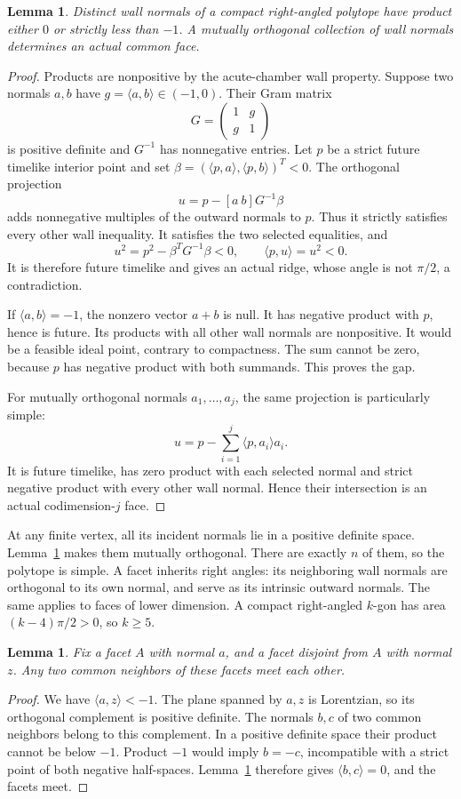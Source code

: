 \documentclass[11pt]{article}
\newtheorem{lemma}[theorem]{Lemma}
\theoremstyle{remark}
\newcommand{\ip}[2]{\langle #1,#2\rangle}
\begin{document}
\begin{lemma}\label{lem:gap}
Distinct wall normals of a compact right-angled polytope have product
either $0$ or strictly less than $-1$. A mutually orthogonal collection
of wall normals determines an actual common face.
\end{lemma}
\begin{proof}
Products are nonpositive by the acute-chamber wall property. Suppose
two normals $a,b$ have $g=\ip{a}{b}\in(-1,0)$. Their Gram matrix
\[
 G=\begin{pmatrix}1&g\\g&1\end{pmatrix}
\]
is positive definite and $G^{-1}$ has nonnegative entries. Let $p$ be a
strict future timelike interior point and set
$\beta=(\ip{p}{a},\ip{p}{b})^T<0$. The orthogonal projection
\[
 u=p-[a\ b]G^{-1}\beta
\]
adds nonnegative multiples of the outward normals to $p$. Thus it
strictly satisfies every other wall inequality. It satisfies the two
selected equalities, and
\[
 u^2=p^2-\beta^TG^{-1}\beta<0,\qquad
 \ip{p}{u}=u^2<0.
\]
It is therefore future timelike and gives an actual ridge, whose angle
is not $\pi/2$, a contradiction.

If $\ip{a}{b}=-1$, the nonzero vector $a+b$ is null. It has negative
product with $p$, hence is future. Its products with all other wall
normals are nonpositive. It would be a feasible ideal point, contrary
to compactness. The sum cannot be zero, because $p$ has negative product
with both summands. This proves the gap.

For mutually orthogonal normals $a_1,\ldots,a_j$, the same projection is
particularly simple:
\[
 u=p-\sum_{i=1}^j\ip{p}{a_i}a_i.
\]
It is future timelike, has zero product with each selected normal and
strict negative product with every other wall normal. Hence their
intersection is an actual codimension-$j$ face.
\end{proof}

At any finite vertex, all its incident normals lie in a positive definite
space. Lemma~\ref{lem:gap} makes them mutually orthogonal. There are
exactly $n$ of them, so the polytope is simple. A facet inherits right
angles: its neighboring wall normals are orthogonal to its own normal,
and serve as its intrinsic outward normals. The same applies to faces
of lower dimension. A compact right-angled $k$-gon has area
$(k-4)\pi/2>0$, so $k\ge5$.

\begin{lemma}\label{lem:footprint}
Fix a facet $A$ with normal $a$, and a facet disjoint from $A$ with
normal $z$. Any two common neighbors of these facets meet each other.
\end{lemma}
\begin{proof}
We have $\ip{a}{z}<-1$. The plane spanned by $a,z$ is Lorentzian, so
its orthogonal complement is positive definite. The normals $b,c$ of
two common neighbors belong to this complement. In a positive definite
space their product cannot be below $-1$. Product $-1$ would imply
$b=-c$, incompatible with a strict point of both negative half-spaces.
Lemma~\ref{lem:gap} therefore gives $\ip{b}{c}=0$, and the facets meet.
\end{proof}
\end{document}
